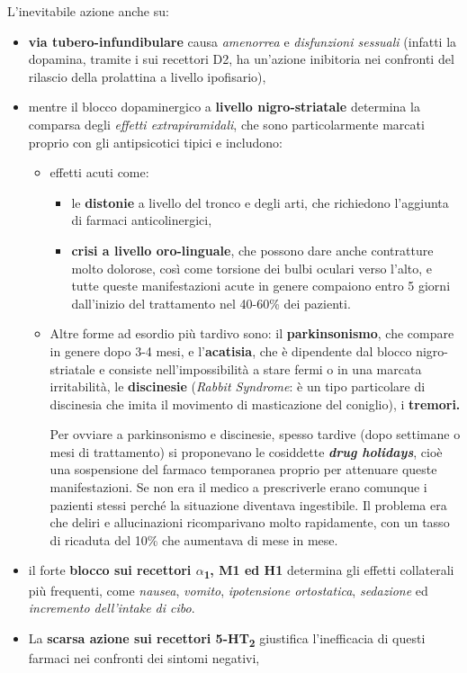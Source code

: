 L'inevitabile azione anche su:

\begin{itemize}
\item
  \textbf{via tubero-infundibulare} causa \emph{amenorrea} e
  \emph{disfunzioni sessuali} (infatti la dopamina, tramite i sui
  recettori D2, ha un'azione inibitoria nei confronti del rilascio della
  prolattina a livello ipofisario),
\item
  mentre il blocco dopaminergico a \textbf{livello nigro-striatale}
  determina la comparsa degli \emph{effetti extrapiramidali}, che sono
  particolarmente marcati proprio con gli antipsicotici tipici e
  includono:

\begin{itemize}
\item
  effetti acuti come:

\begin{itemize}
\item
  le \textbf{distonie} a livello del tronco e degli arti, che richiedono
  l'aggiunta di farmaci anticolinergici,
\item
  \textbf{crisi a livello oro-linguale}, che possono dare anche
  contratture molto dolorose, così come torsione dei bulbi oculari verso
  l'alto, e tutte queste manifestazioni acute in genere compaiono entro
  5 giorni dall'inizio del trattamento nel 40-60\% dei pazienti.
\end{itemize}

\item
  Altre forme ad esordio più tardivo sono: il \textbf{parkinsonismo},
  che compare in genere dopo 3-4 mesi, e l'\textbf{acatisia}, che è
  dipendente dal blocco nigro-striatale e consiste nell'impossibilità a
  stare fermi o in una marcata irritabilità, le \textbf{discinesie}
  (\emph{Rabbit Syndrome}: è un tipo particolare di discinesia che imita
  il movimento di masticazione del coniglio), i \textbf{tremori.}

  Per ovviare a parkinsonismo e discinesie, spesso tardive (dopo
  settimane o mesi di trattamento) si proponevano le cosiddette
  \emph{\textbf{drug holidays}}, cioè una sospensione del farmaco
  temporanea proprio per attenuare queste manifestazioni. Se non era il
  medico a prescriverle erano comunque i pazienti stessi perché la
  situazione diventava ingestibile. Il problema era che deliri e
  allucinazioni ricomparivano molto rapidamente, con un tasso di
  ricaduta del 10\% che aumentava di mese in mese.
\end{itemize}

\item
  il forte \textbf{blocco sui recettori $\alpha$\textsubscript{1}, M1 ed H1}
  determina gli effetti collaterali più frequenti, come \emph{nausea},
  \emph{vomito}, \emph{ipotensione ortostatica}, \emph{sedazione} ed
  \emph{incremento dell'intake di cibo}.
\item
  La \textbf{scarsa azione sui recettori 5-HT\textsubscript{2}}
  giustifica l'inefficacia di questi farmaci nei confronti dei sintomi
  negativi,
\end{itemize}


